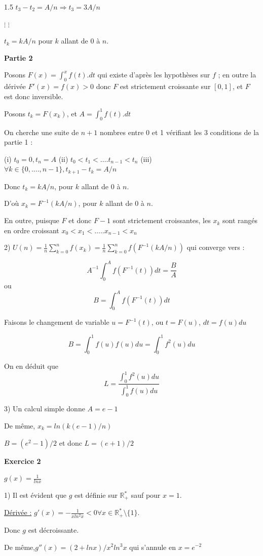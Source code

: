 \documentclass[12pt]{article}
\begin{document}
\begin{spacing}{1.5}
$t_3-t_2=A/n \Rightarrow t_3=3A/n$

$\vdots$					$\vdots$

$t_k=kA/n$ pour $k$ allant de 0 à $n$.

\medskip\textbf{Partie 2}

Posons $F(x)=\int_0^xf(t).dt$  qui existe d'après les hypothèses sur $f$ ; en outre la dérivée 
$F'(x) =f(x) > 0$ donc $F$ est strictement croissante sur $[0,1]$, et $F$ est donc inversible. 

Posons $t_k = F(x_k)$, et $A = \int_0^1f(t).dt$

On cherche une suite de $n+1$ nombres entre 0 et 1 vérifiant les 3 conditions de la partie 1 :  

(i)    $t_0 = 0, t_n = A$ 
(ii)   $t_0 < t_1 < ….t_{n-1} < t_n$
(iii)  $\forall k\in \lbrace 0, ...., n-1\rbrace, t_{k+1}-t_{k}= A/n$

Donc $t_k = kA/n$, pour $k$ allant de 0 à $n$. 

D'où $x_k = F^{-1}(kA/n)$, pour $k$ allant de 0 à $n$. 

En outre, puisque $F$ et donc $F-1$ sont strictement croissantes, les $x_k$ sont rangés en ordre croissant $x_0 < x_1 < ….. x_{n-1} < x_n$   

 2) $U(n) =\frac{1}{n}\sum_{k=0}^nf(x_k)= \frac{1}{n}\sum_{k=0}^nf(F^{-1}(kA/n))$ qui converge vers :
 
 \[
 A^{-1}\int_0^Af(F^{-1}(t))dt=\frac{B}{A}\] ou \[B=\int_0^Af(F^{-1}(t))dt\]
 
 Faisons le changement de variable $u=F^{-1}(t)$, ou $t=F(u)$, $dt=f(u)du$
 
 \[
 B=\int_0^1f(u)f(u)du=\int_0^1f^2(u)du\]
 
 On en déduit que \[L=\frac{\int_0^1f^2(u)du}{\int_0^1f(u)du}\]

3) Un calcul simple donne $A=e-1$
 
 De même, $x_k=ln(k(e-1)/n)$
 
 $B =(e^2-1)/2$ et donc $L=(e+1)/2$
 
 \medskip\textbf{Exercice 2}
 
 $g(x)=\frac{1}{lnx}$
 
 1) Il est évident que $g$ est définie sur $\mathbb{R}_+^{\ast}$ sauf pour $x = 1$. 

\underline{Dérivée :} $g'(x) =-\frac{1}{xln^2x}< 0 \forall x \in \mathbb{R}_+^{\ast}\setminus\{1\}$. 

Donc $g$ est décroissante. 

De même,$ g''(x) = (2 + lnx)/x^2ln^3x$ qui s'annule en $x = e^{-2} $


\end{spacing}
\end{document}
